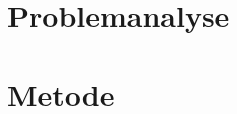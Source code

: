 








\frontmatter



\tableofcontents*

\mainmatter







\chapter{Problemanalyse}


%
%
%
%

\chapter{Metode}


